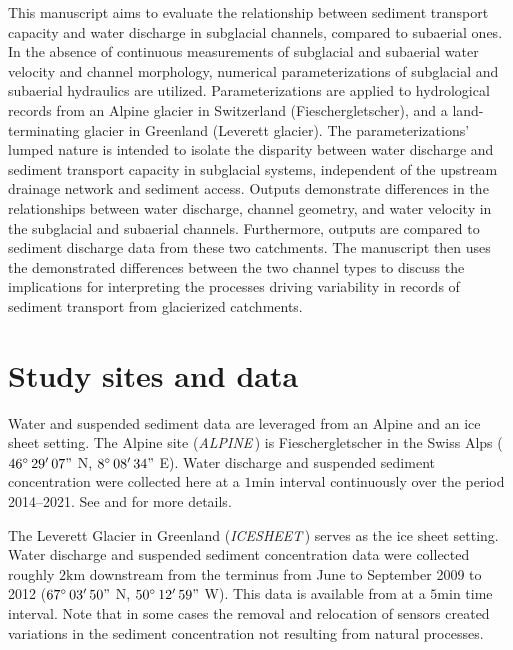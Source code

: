 \documentclass[11pt]{article}
\newcommand{\TODO}[1]{\textbf{TODO: \color{red}#1}}
\newcommand{\alpine}{\textit{ALPINE}\,}
\newcommand{\icesheet}{\textit{ICESHEET}\,}
\newcommand{\unit}[1]{$\mathrm{#1}$}
\begin{document}
This manuscript aims to evaluate the relationship between sediment transport capacity and water discharge in subglacial channels, compared to subaerial ones.
In the absence of continuous measurements of subglacial and subaerial water velocity and channel morphology, numerical parameterizations of subglacial and subaerial hydraulics are utilized.
Parameterizations are applied to hydrological records from an Alpine glacier in Switzerland (Fieschergletscher), and  a land-terminating glacier in Greenland (Leverett glacier).
The parameterizations' lumped nature is intended to isolate the disparity between water discharge and sediment transport capacity in subglacial systems, independent of the upstream drainage network and sediment access.
Outputs demonstrate differences in the relationships between  water discharge, channel geometry, and water velocity in the subglacial and subaerial channels. 
Furthermore, outputs are compared to sediment discharge data from these two catchments.
The manuscript then uses the demonstrated differences between the two channel types to discuss the implications for interpreting the processes driving variability in records of sediment transport from glacierized catchments.

\section{Study sites and data}
\label{sect:ss_data}


Water and suspended sediment data are leveraged from an Alpine and an ice sheet setting.
The Alpine site (\alpine) is  Fieschergletscher in the Swiss Alps ($46^\circ\,29'\,07"$ N, $8^\circ\,08'\,34"$ E).
Water discharge and suspended sediment concentration were collected here at a $1$\unit{min} interval continuously over the period 2014--2021. 
See \citet{felix2022} and \citet{felix2021} for more details.

The Leverett Glacier in Greenland (\icesheet) serves as the ice sheet setting.
Water discharge and suspended sediment concentration data were collected roughly $2$\unit{km} downstream from the terminus from June to September 2009 to 2012 ($67^\circ\,03'\,50"$ N, $50^\circ\,12'\,59"$ W).
This data is available from \citet{tedstone2017} at a $5$\unit{min} time interval.
Note that in some cases the removal and relocation of sensors created variations in the sediment concentration not resulting from natural processes.
\end{document}
